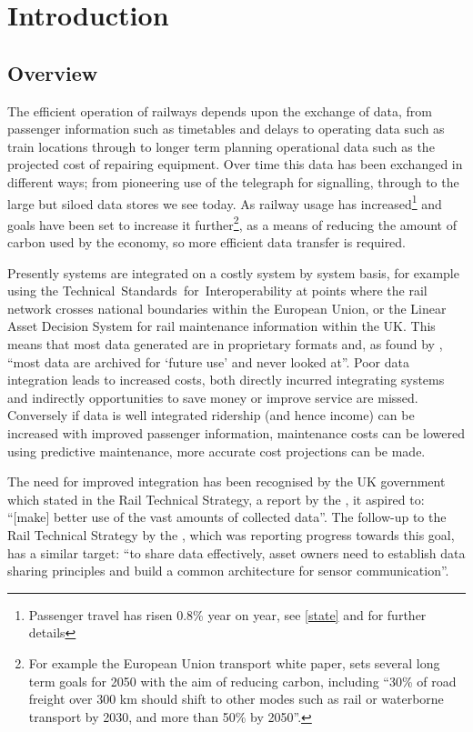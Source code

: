 \chapter{Introduction}\label{ch:intro}
\section{Overview}
The efficient operation of railways depends upon the exchange of data, from passenger information such as timetables and delays to operating data such as train locations through to longer term planning operational data such as the projected cost of repairing equipment. Over time this data has been exchanged in different ways; from pioneering use of the telegraph for signalling, through to the large but siloed data stores we see today. As railway usage has increased\footnote{Passenger travel has risen 0.8\% year on year, see \autoref{state} and \citep{OfficeofRoad&Rail2016} for further details} and goals have been set to increase it further\footnote{For example the European Union transport white paper, \citet{EC2011} sets several long term goals for 2050 with the aim of reducing carbon, including \enquote{30\% of road freight over 300 km should shift to other modes such as rail or waterborne transport by 2030, and more than 50\% by 2050}.}, as a means of reducing the amount of carbon used by the economy, so more efficient data transfer is required. 

Presently systems are integrated on a costly system by system basis, for example using the Technical~Standards~for~Interoperability at points where the rail network crosses national boundaries within the European Union, or the Linear Asset Decision System for rail maintenance information within the UK. This means that most data generated are in proprietary formats and, as found by \citet{Kopf2010}, \enquote{most data are archived for \enquote{future use} and never looked at}. Poor data integration leads to increased costs, both directly incurred integrating systems and indirectly opportunities to save money or improve service are missed. Conversely if data is well integrated ridership (and hence income) can be increased with improved passenger information, maintenance costs can be lowered using predictive maintenance, more accurate cost projections can be made.

The need for improved integration has been recognised by the UK government which stated in the Rail Technical Strategy, a report by the \citet{TechnicalStrategyLeadershipGroup2012b}, it aspired to: ``[make] better use of the vast amounts of collected data''. The follow-up to the Rail Technical Strategy by the \citet{RDG2017}, which was reporting progress towards this goal, has a similar target: ``to share data effectively, asset owners need to establish data sharing principles and build a common architecture for sensor communication''.

